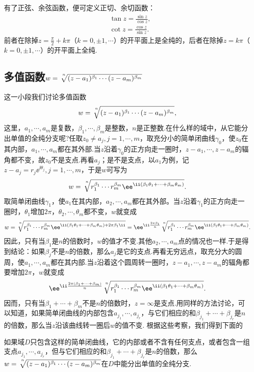 有了正弦、余弦函数，便可定义正切、余切函数：
\begin{align*}
  &\tan z=\frac{\sin z}{\cos z},\\
  &\cot z=\frac{\cos z}{\sin z}.
\end{align*}
前者在除掉$z=\frac\pi2+k\pi$（$k=0,\pm1,\cdots$）的开平面上是全纯的，后者在除掉$z=k\pi$（$k=0,\pm1,\cdots$）的开平面上全纯.

\subsection{多值函数\texorpdfstring{$w=\sqrt[\leftroot{-2}\uproot{6}n]{(z-a_1)^{\beta_1}\cdots(z-a_m)^{\beta_m}}$}{}}

这一小段我们讨论多值函数
\[w=\sqrt[\leftroot{-2}\uproot{6} n]{(z-a_1)^{\beta_1}\cdots(z-a_m)^{\beta_m}},\]
这里，$a_1,\cdots,a_m$是复数，$\beta_1,\cdots,\beta_m$是整数，$n$是正整数.在什么样的域中，从它能分出单值的全纯分支呢?任取$z_0\ne a_j,j=1,\cdots,m$，取充分小的简单闭曲线$\gamma_0$，使$z_0$在其内部，$a_1,\cdots,a_m$都在其外部.当$z$沿着$\gamma_0$的正方向走一圈时，$z-a_1,\cdots,z-a_m$的辐角都不变，故$z_0$不是支点.再看$a_j$；是不是支点，以$a_1$为例，记$z-a_j=r_j\ee^{\ii\theta_j},j=1,\cdots,m$，于是$w$可写为
\[w=\sqrt[\uproot{6}\leftroot{-2} n]{r_1^{\beta_1}\cdots r_m^{\beta_m}\ee^{\ii(\beta_1\theta_1+\cdots+\beta_m\theta_m)}}.\]
取简单闭曲线$\gamma_1$，使$a_1$在其内部，$a_2,\cdots,a_m$都在其外部。当$z$沿着$\gamma_1$的正方向走一圈时，$\theta_1$增加$2\pi$，$\theta_2,\cdots,\theta_m$都不变，$w$就变成
\[w=\sqrt[\leftroot{-2}\uproot{6}n]{r_1^{\beta_1}\cdots r_m^{\beta_m}\ee^{\ii(\beta_1\theta_1+\cdots+\beta_m\theta_m)+2\pi\beta_1\ii}}
=\ee^{\ii\frac{2\pi\beta_1}n}\sqrt[\leftroot{-2}\uproot{6}n]{r_1^{\beta_1}\cdots r_m^{\beta_m}\ee^{\ii(\beta_1\theta_1+\cdots+\beta_m\theta_m)}}.\]
因此，只有当$\beta_1$是$n$的倍数时，$w$的值才不变.其他$a_2,\cdots,a_m$点的情况也一样.于是得到结论：如果$\beta_j$不是$n$的倍数，那么$a_j$是它的支点.再看无穷远点，取充分大的圆周，使$a_1,\cdots,a_m$都在其内部.当$z$沿着这个圆周转一圈时，$z-a_1,\cdots,z-a_m$的辐角都要增加$2\pi$，$w$就变成
\[\ee^{\ii\frac{2\pi(\beta_1+\cdots+\beta_m)}n}\sqrt[\leftroot{-2}\uproot{6}n]{r_1^{\beta_1}\cdots r_m^{\beta_m}\ee^{\ii(\beta_1\theta_1+\cdots+\beta_m\theta_m)}}.\]
因而，只有当$\beta_1+\cdots+\beta_m$不是$n$的倍数时，$z=\infty$是支点.用同样的方法讨论，可以知道，如果简单闭曲线的内部包含$a_{j_1},\cdots,a_{j_r}$，与它们相应的和$\beta_{j_1}+\cdots+\beta_{j_r}$是$n$的倍数，那么当$z$沿该曲线转一圈后$w$的值不变. 根据这些考察，我们得到下面的
\begin{theorem}\label{thm2.4.7}
如果域$D$只包含这样的简单闭曲线，它的内部或者不含有任何支点，或者包含一组支点$a_{j_1},\cdots,a_{j_r}$，但与它们相应的和$\beta_ {j_1}+\cdots+\beta_{j_r}$是$n$的倍数，那么$w=\sqrt[\leftroot{-2}\uproot{6} n]{(z-a_1)^{\beta_1}\cdots(z-a_m)^{\beta_m}}$在$D$中能分出单值的全纯分支.
\end{theorem}

